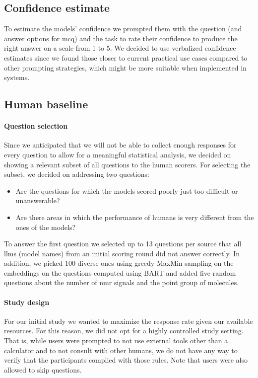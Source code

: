 \documentclass[11pt, oneside]{article}
\begin{document}
\begin{refsection}
\subsection{Confidence estimate}
To estimate the models' confidence we prompted them with the question (and answer options for \gls{mcq}) and the task to rate their confidence to produce the right answer on a scale from 1 to 5. 
We decided to use verbalized confidence estimates\autocite{xiong2023llms} since we found those closer to current practical use cases compared to other prompting strategies, which might be more suitable when implemented in systems.

\subsection{Human baseline}


\paragraph{Question selection} \label{sec:subset-selection}
Since we anticipated that we will not be able to collect enough responses for every question to allow for a meaningful statistical analysis, we decided on showing a relevant subset of all questions to the human scorers.
For selecting the subset, we decided on addressing two questions:
\begin{itemize}
    \item Are the questions for which the models scored poorly just too difficult or unanswerable?
    \item Are there areas in which the performance of humans is very different from the ones of the models?
\end{itemize}
To answer the first question we selected up to 13 questions per source that all \glspl{llm} (model names) from an initial scoring round did not answer correctly.
In addition, we picked 100 diverse ones using greedy MaxMin sampling on the embeddings on the questions computed using BART and added five random questions about the number of \gls{nmr} signals and the point group of molecules.

\paragraph{Study design}
For our initial study we wanted to maximize the response rate given our available resources. 
For this reason, we did not opt for a highly controlled study setting. 
That is, while users were prompted to not use external tools other than a calculator and to not consult with other humans, we do not have any way to verify that the participants complied with those rules. 
Note that users were also allowed to skip questions.


\end{refsection}
\end{document}
